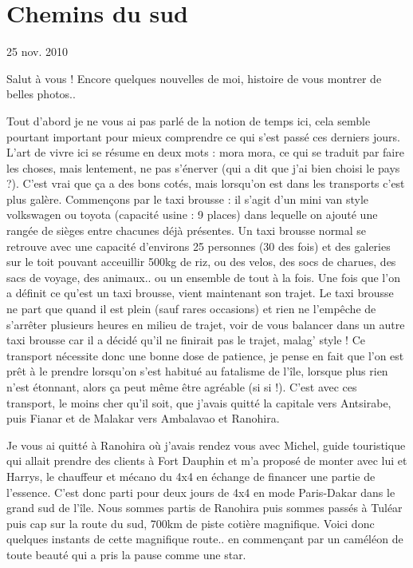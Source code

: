 \section{Chemins du sud}

25 nov. 2010

\begin{multicols}{2}

Salut à vous ! Encore quelques nouvelles de moi, histoire de vous montrer de belles photos..

Tout d'abord je ne vous ai pas parlé de la notion de temps ici, cela semble pourtant important pour mieux comprendre ce qui s'est passé ces derniers jours. L'art de vivre ici se résume en deux mots : mora mora, ce qui se traduit par faire les choses, mais lentement, ne pas s'énerver (qui a dit que j'ai bien choisi le pays ?). C'est vrai que ça a des bons cotés, mais lorsqu'on est dans les transports c'est plus galère. Commençons par le taxi brousse : il s'agit d'un mini van style volkswagen ou toyota (capacité usine : 9 places) dans lequelle on ajouté une rangée de sièges entre chacunes déjà présentes. Un taxi brousse normal se retrouve avec une capacité d'environs 25 personnes (30 des fois) et des galeries sur le toit pouvant acceuillir 500kg de riz, ou des velos, des socs de charues, des sacs de voyage, des animaux.. ou un ensemble de tout à la fois. Une fois que l'on a définit ce qu'est un taxi brousse, vient maintenant son trajet. Le taxi brousse ne part que quand il est plein (sauf rares occasions) et rien ne l'empêche de s'arrêter plusieurs heures en milieu de trajet, voir de vous balancer dans un autre taxi brousse car il a décidé qu'il ne finirait pas le trajet, malag' style ! Ce transport nécessite donc une bonne dose de patience, je pense en fait que l'on est prêt à le prendre lorsqu'on s'est habitué au fatalisme de l'île, lorsque plus rien n'est étonnant, alors ça peut même être agréable (si si !). C'est avec ces transport, le moins cher qu'il soit, que j'avais quitté la capitale vers Antsirabe, puis Fianar et de Malakar vers Ambalavao et Ranohira.

Je vous ai quitté à Ranohira où j'avais rendez vous avec Michel, guide touristique qui allait prendre des clients à Fort Dauphin et m'a proposé de monter avec lui et Harrys, le chauffeur et mécano du 4x4 en échange de financer une partie de l'essence. C'est donc parti pour deux jours de 4x4 en mode Paris-Dakar dans le grand sud de l'île. Nous sommes partis de Ranohira puis sommes passés à Tuléar puis cap sur la route du sud, 700km de piste cotière magnifique. Voici donc quelques instants de cette magnifique route.. en commençant par un caméléon de toute beauté qui a pris la pause comme une star.


\end{multicols}
